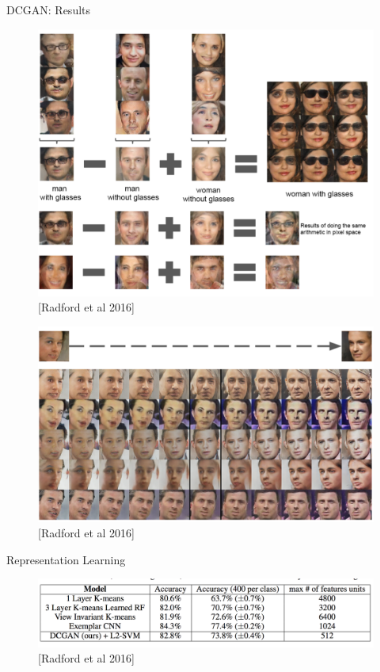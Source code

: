 \begin{frame}[allowframebreaks]{DCGAN: Results}
    \framebreak

    \begin{figure}
        \centering
        \includegraphics[height=0.8\textheight,keepaspectratio]{images/gan/dcgan-result-6.png}
        \caption*{[Radford et al 2016]}
    \end{figure}

    \framebreak

    \begin{figure}
        \centering
        \includegraphics[height=0.8\textheight,keepaspectratio]{images/gan/dcgan-result-7.png}
        \caption*{[Radford et al 2016]}
    \end{figure}

    \framebreak

    Representation Learning 
    \begin{figure}
        \centering
        \includegraphics[width=1.05\textwidth,keepaspectratio]{images/gan/dcgan-result-table.png}
        \caption*{[Radford et al 2016]}
    \end{figure}
\end{frame}